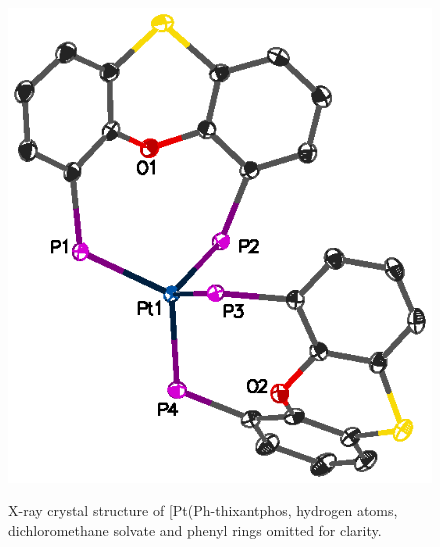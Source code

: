 \begin{figure}[htbp]
\begin{center}
\vspace{0.5cm}
\includegraphics[scale=0.97]{../Figures/CrystalPtSPh2phenyl.eps}
\caption[X-ray crystal structure of [Pt(Ph-thixantphos\ce{)2]}]{X-ray crystal structure of [Pt(Ph-thixantphos\ce{)2]}, hydrogen atoms, dichloromethane solvate and phenyl rings omitted for clarity.}
\vspace{0.2cm}
\label{crystalbisthixantphosplatinumphenyl}
\end{center}
\end{figure}
\vspace{0.2cm}

